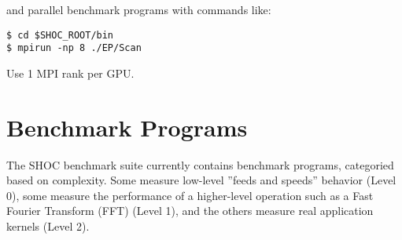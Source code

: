 \documentclass[11pt]{article}
\begin{document}
and parallel benchmark programs with commands like:

\begin{Verbatim}[frame=single]
$ cd $SHOC_ROOT/bin
$ mpirun -np 8 ./EP/Scan
\end{Verbatim}

Use 1 MPI rank per GPU.  


\section{Benchmark Programs}\label{sec:programs}

The SHOC benchmark suite currently contains benchmark programs, categoried
based on complexity.  Some measure low-level ''feeds and speeds'' behavior
(Level 0), some measure the performance of a higher-level operation such 
as a Fast Fourier Transform (FFT) (Level 1), and the others measure 
real application kernels (Level 2).

\newpage 
\end{document}
